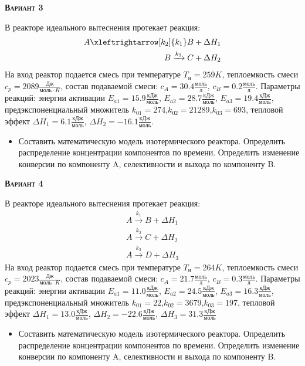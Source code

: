 \textsc{\textbf{Вариант 3}}

 В реакторе идеального вытеснения протекает реакция: \begin{equation*} \begin{aligned} A \xleftrightarrow[k_2]{k_1} B + \Delta H_1 \\ B \xrightarrow{k_3} C + \Delta H_2 \end{aligned} \end{equation*}                              На вход  реактор подается смесь при температуре $ T_{н} =  259 K$, теплоемкость смеси $c_p= 2089 \frac{Дж}{моль \cdot K}$, состав подаваемой смеси: $c_A=30.4 \frac{моль}{л}$, $c_B=0.2 \frac{моль}{л}$. Параметры реакций: энергии активации $E_{a1}=15.9 \frac{кДж}{моль}$, $E_{a2}=28.7  \frac{кДж}{моль}$, $E_{a3}=19.4  \frac{кДж}{моль}$, предэкспоненциальный множитель $k_{01}=       274$,$k_{02}=     21289$,$k_{03}=       693$, тепловой эффект $\Delta H_1=  6.1  \frac{кДж}{моль}$, $\Delta H_2=-16.1 \frac{кДж}{моль}$.\begin{itemize} \item Составить математическую модель изотермического реактора. Определить распределение концентрации компонентов по времени. Определить изменение конверсии по компоненту A, селективности и выхода по компоненту B. \end{itemize}

\textsc{\textbf{Вариант 4}}

 В реакторе идеального вытеснения протекает реакция: \begin{equation*} \begin{aligned} A \xrightarrow{k_1} B + \Delta H_1 \\ A \xrightarrow{k_2} C + \Delta H_2 \\ A \xrightarrow{k_3} D + \Delta H_3 \end{aligned} \end{equation*} На вход  реактор подается смесь при температуре $ T_{н} =  264 K$, теплоемкость смеси $c_p= 2023 \frac{Дж}{моль \cdot K}$, состав подаваемой смеси: $c_A=21.7 \frac{моль}{л}$, $c_B=0.3 \frac{моль}{л}$. Параметры реакций: энергии активации $E_{a1}=11.0 \frac{кДж}{моль}$, $E_{a2}=24.5  \frac{кДж}{моль}$, $E_{a3}=16.3  \frac{кДж}{моль}$, предэкспоненциальный множитель $k_{01}=        22$,$k_{02}=      3679$,$k_{03}=       197$, тепловой эффект $\Delta H_1= 13.0 \frac{кДж}{моль}$, $\Delta H_2=-22.6 \frac{кДж}{моль}$, $\Delta H_3 = 31.3 \frac{кДж}{моль}$\begin{itemize} \item Составить математическую модель изотермического реактора. Определить распределение концентрации компонентов по времени. Определить изменение конверсии по компоненту A, селективности и выхода по компоненту B. \end{itemize}

